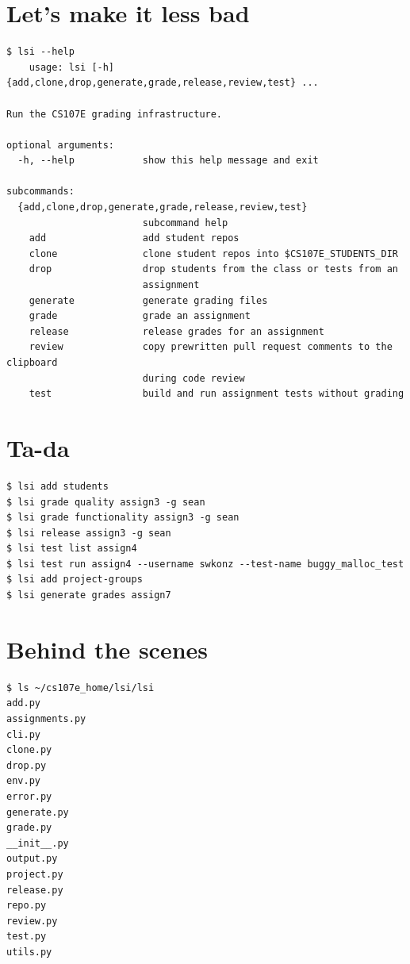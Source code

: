 \documentclass{article}
\begin{document}
\newpage

\section*{Let's make it less bad}
\vspace{2ex}
\begin{verbatim}
$ lsi --help 
    usage: lsi [-h] {add,clone,drop,generate,grade,release,review,test} ...

Run the CS107E grading infrastructure.

optional arguments:
  -h, --help            show this help message and exit

subcommands:
  {add,clone,drop,generate,grade,release,review,test}
                        subcommand help
    add                 add student repos
    clone               clone student repos into $CS107E_STUDENTS_DIR
    drop                drop students from the class or tests from an
                        assignment
    generate            generate grading files
    grade               grade an assignment
    release             release grades for an assignment
    review              copy prewritten pull request comments to the clipboard
                        during code review
    test                build and run assignment tests without grading
\end{verbatim}

\newpage

\section*{Ta-da}
\vspace{2ex}
\begin{verbatim}
$ lsi add students
$ lsi grade quality assign3 -g sean
$ lsi grade functionality assign3 -g sean
$ lsi release assign3 -g sean
$ lsi test list assign4
$ lsi test run assign4 --username swkonz --test-name buggy_malloc_test
$ lsi add project-groups
$ lsi generate grades assign7
\end{verbatim}

\newpage

\section*{Behind the scenes}
\vspace{2ex}
\begin{verbatim}
$ ls ~/cs107e_home/lsi/lsi
add.py
assignments.py
cli.py
clone.py
drop.py
env.py
error.py
generate.py
grade.py
__init__.py
output.py
project.py
release.py
repo.py
review.py
test.py
utils.py
\end{verbatim}
\end{document}
